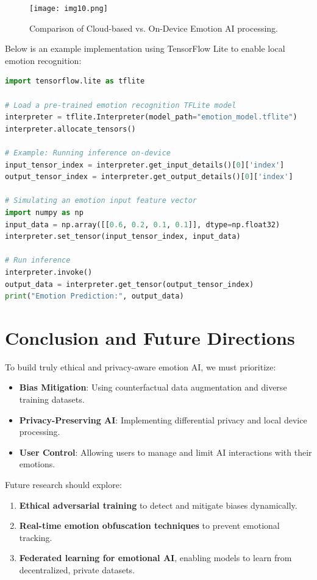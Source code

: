 \documentclass[a4paper,10pt]{article}
\begin{document}
\begin{figure}[h]
    \centering
    \texttt{[image: img10.png]}
    \caption{Comparison of Cloud-based vs. On-Device Emotion AI processing.}
    \label{fig:ondevice}
\end{figure}

Below is an example implementation using TensorFlow Lite to enable local emotion recognition:

\begin{lstlisting}[language=Python, caption=Deploying an Emotion Model with TensorFlow Lite, label=lst:tflite, basicstyle=\ttfamily\footnotesize]
import tensorflow.lite as tflite

# Load a pre-trained emotion recognition TFLite model
interpreter = tflite.Interpreter(model_path="emotion_model.tflite")
interpreter.allocate_tensors()

# Example: Running inference on-device
input_tensor_index = interpreter.get_input_details()[0]['index']
output_tensor_index = interpreter.get_output_details()[0]['index']

# Simulating an emotion input feature vector
import numpy as np
input_data = np.array([[0.6, 0.2, 0.1, 0.1]], dtype=np.float32)
interpreter.set_tensor(input_tensor_index, input_data)

# Run inference
interpreter.invoke()
output_data = interpreter.get_tensor(output_tensor_index)
print("Emotion Prediction:", output_data)
\end{lstlisting}

\section{Conclusion and Future Directions}
To build truly ethical and privacy-aware emotion AI, we must prioritize:
\begin{itemize}
    \item \textbf{Bias Mitigation}: Using counterfactual data augmentation and diverse training datasets.
    \item \textbf{Privacy-Preserving AI}: Implementing differential privacy and local device processing.
    \item \textbf{User Control}: Allowing users to manage and limit AI interactions with their emotions.
\end{itemize}


Future research should explore:
\begin{enumerate}
    \item \textbf{Ethical adversarial training} to detect and mitigate biases dynamically.
    \item \textbf{Real-time emotion obfuscation techniques} to prevent emotional tracking.
    \item \textbf{Federated learning for emotional AI}, enabling models to learn from decentralized, private datasets.
\end{enumerate}
\end{document}
